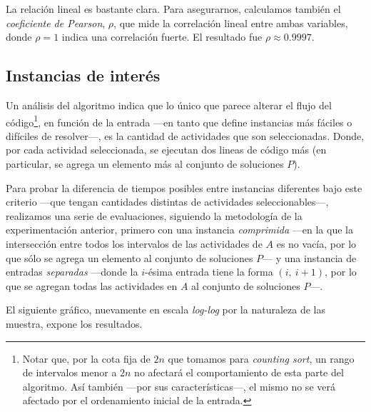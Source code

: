 La relación lineal es bastante clara. Para asegurarnos, calculamos también el \textit{coeficiente de Pearson}, $\rho$, que mide la correlación lineal entre ambas variables, donde $\rho = 1$ indica una correlación fuerte. El resultado fue $\rho \approx 0.9997$.

\subsection{Instancias de interés}

Un análisis del algoritmo indica que lo único que parece alterar el flujo del código\footnote{Notar que, por la cota fija de $2n$ que tomamos para \textit{counting sort}, un rango de intervalos menor a $2n$ no afectará el comportamiento de esta parte del algoritmo. Así también ---por sus características---, el mismo no se verá afectado por el ordenamiento inicial de la entrada.}, en función de la entrada ---en tanto que define instancias más fáciles o difíciles de resolver---, es 
la cantidad de actividades que son seleccionadas. Donde, por cada actividad seleccionada, se ejecutan dos lineas de código más (en particular, se agrega un elemento más al conjunto de soluciones $P$). %

Para probar la diferencia de tiempos posibles entre instancias diferentes bajo este criterio ---que tengan cantidades distintas de actividades seleccionables---, realizamos una serie de evaluaciones, siguiendo la metodología de la experimentación anterior, primero con una instancia \textit{comprimida} ---en la que la intersección entre todos los intervalos de las actividades de $A$ es no vacía, por lo que sólo se agrega un elemento al conjunto de soluciones $P$--- y una instancia de entradas \textit{separadas} ---donde la $i$-ésima entrada tiene la forma $(i,\ i+1)$, por lo que se agregan todas las actividades en $A$ al conjunto de soluciones $P$---. 

El siguiente gráfico, nuevamente en escala \textit{log-log} por la naturaleza de las muestra, expone los resultados.

